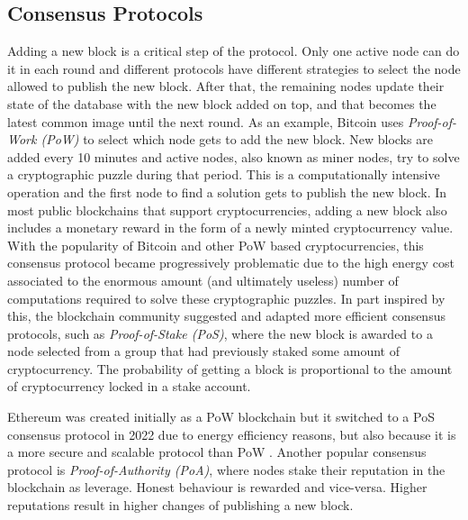 \documentclass[../main.tex]{subfiles}
\begin{document}
\subsection{Consensus Protocols}
Adding a new block is a critical step of the protocol. Only one active node can do it in each round and different protocols have different strategies to select the node allowed to publish the new block. After that, the remaining nodes update their state of the database with the new block added on top, and that becomes the latest common image until the next round. As an example, Bitcoin uses \textit{Proof-of-Work (PoW)} to select which node gets to add the new block. New blocks are added every 10 minutes and active nodes, also known as miner nodes, try to solve a cryptographic puzzle during that period. This is a computationally intensive operation and the first node to find a solution gets to publish the new block. In most public blockchains that support cryptocurrencies, adding a new block also includes a monetary reward in the form of a newly minted cryptocurrency value. With the popularity of Bitcoin and other PoW based cryptocurrencies, this consensus protocol became progressively problematic due to the high energy cost associated to the enormous amount (and ultimately useless) number of computations required to solve these cryptographic puzzles. In part inspired by this, the blockchain community suggested and adapted more efficient consensus protocols, such as \textit{Proof-of-Stake (PoS)}, where the new block is awarded to a node selected from a group that had previously staked some amount of cryptocurrency. The probability of getting a block is proportional to the amount of cryptocurrency locked in a stake account.
\par
Ethereum was created initially as a PoW blockchain but it switched to a PoS consensus protocol in 2022 due to energy efficiency reasons, but also because it is a more secure and scalable protocol than PoW \cite{ethereum2024}. Another popular consensus protocol is \textit{Proof-of-Authority (PoA)}, where nodes stake their reputation in the blockchain as leverage. Honest behaviour is rewarded and vice-versa. Higher reputations result in higher changes of publishing a new block.
\end{document}

